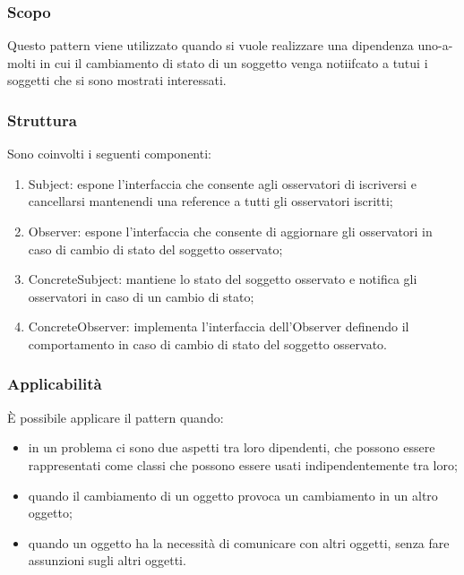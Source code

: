\subsubsection{Scopo} Questo pattern viene utilizzato quando si vuole realizzare una dipendenza uno-a-molti in cui il cambiamento di stato di un soggetto venga notiifcato a tutui i soggetti che si sono mostrati interessati.

\subsubsection{Struttura} Sono coinvolti i seguenti componenti:
\begin{enumerate}
	\item Subject: espone l’interfaccia che consente agli osservatori di iscriversi e cancellarsi mantenendi una reference a tutti gli osservatori iscritti;
	\item Observer: espone l’interfaccia che consente di aggiornare gli osservatori in caso di cambio di stato del soggetto osservato;
	\item ConcreteSubject: mantiene lo stato del soggetto osservato e notifica gli osservatori in caso di un cambio di stato;
	\item ConcreteObserver: implementa l’interfaccia dell’Observer definendo il comportamento in caso di cambio di stato del soggetto osservato.
\end{enumerate}

\subsubsection{Applicabilità} È possibile applicare il pattern quando:
\begin{itemize}
	\item in un problema ci sono due aspetti tra loro dipendenti, che possono essere rappresentati come classi che possono essere usati indipendentemente tra loro;
	\item quando il cambiamento di un oggetto provoca un cambiamento in un altro oggetto;
	\item quando un oggetto ha la necessità di comunicare con altri oggetti, senza fare assunzioni sugli altri oggetti.
\end{itemize}

